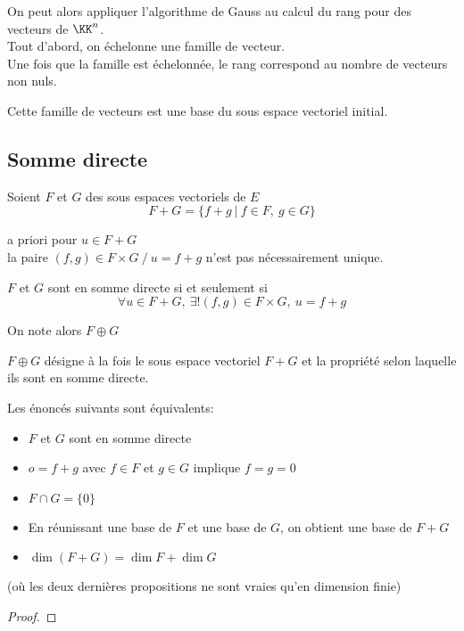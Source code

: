 \documentclass[../main.tex]{subfile}
\begin{document}
On peut alors appliquer l'algorithme de Gauss  au calcul du rang pour des vecteurs de $\KK^n$.\\
Tout d'abord, on échelonne une famille de vecteur.\\
Une fois que la famille est échelonnée, le rang correspond au nombre de vecteurs non nuls.\\

\begin{rema}
	Cette famille de vecteurs est une base du sous espace vectoriel initial.
\end{rema}

\subsection{Somme directe}
Soient $F$ et $G$ des sous espaces vectoriels de $E$\\
$$F+G = \{f+g \ | \ f \in F, \ g \in G\}$$

a priori pour $u \in F+G$\\
la paire $(f,g) \in F \times G \ / \ u=f+g$ n'est pas nécessairement unique.\\

\begin{defi}
	$F$ et $G$ sont en somme directe si et seulement si 
	$$\forall u \in F + G, \ \exists! (f,g) \in F \times G, \ u = f+g$$
\end{defi}

\begin{nota}
	On note alors $F \oplus G$
\end{nota}

\begin{rema}
	$F \oplus G$ désigne à la fois le sous espace vectoriel $F+G$ et la propriété selon laquelle ils sont en somme directe.
\end{rema}


\begin{prop}
	Les énoncés suivants sont équivalents:
\begin{itemize}	
	\item $F$ et $G$ sont en somme directe
	\item $o = f+g$ avec $f \in F$ et $g \in G$ implique $f=g=0$
	\item $F \cap G = \{0\}$
	\item En réunissant une base de $F$ et une base de $G$, on obtient une base de $F+G$
	\item $\dim(F+G) = \dim F + \dim G$
\end{itemize}
	(où les deux dernières propositions ne sont vraies qu'en dimension finie)
\end{prop}

\begin{proof}
\end{proof}
\end{document}
